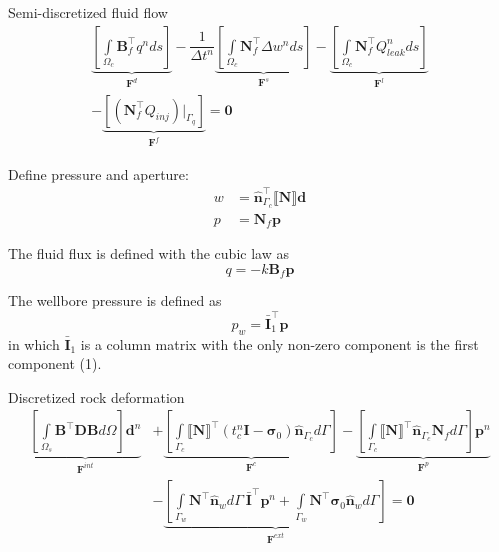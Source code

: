 \documentclass{article}
\begin{document}
Semi-discretized fluid flow
	\begin{equation}
\label{eqn:fluid-discrete}
\begin{gathered}
\underbrace{\left[\int\limits_{\Omega_c}
	\mathbf{B}_f^\top q^n ds 
	\right]}_{\mathbf{F}^d}
-
\dfrac{1}{\Delta t^n}
\underbrace{\left[
	\int\limits_{\Omega_c} \mathbf{N}_f^\top \Delta w^n ds 
	\right]}_{\mathbf{F}^s}
-
\underbrace{\left[
	\int\limits_{\Omega_c} \mathbf{N}_f^{\top} Q_{leak}^n ds
	\right]}_{\mathbf{F}^l}
	\\
-
\underbrace{\left[
	\left(\mathbf{N}_f^{\top} Q_{inj} \right) \Big\rvert_{\Gamma_q} 
	\right]}_{\mathbf{F}^f}
= \mathbf{0} 
\end{gathered}
\end{equation}


Define pressure and aperture: 
\begin{align}
	w &= \hat{\mathbf{n}}_{\Gamma_c}^{\top} \llbracket\mathbf{N}\rrbracket \mathbf{d}
	\\
	p &= \mathbf{N}_f \mathbf{p}
\end{align}

The fluid flux is defined with the cubic law as
\begin{equation}
q = -k \mathbf{B}_f \mathbf{p}
\end{equation}

The wellbore pressure is defined as
\begin{equation}
	p_w = \bar{\mathbf{I}}_1^{\top} \mathbf{p}
\end{equation}
in which $\bar{\mathbf{I}}_1$ is a column matrix with the only non-zero component is the first component (1).

Discretized rock deformation	
\begin{equation}
\begin{aligned}
\underbrace{\left[\int\limits_{\Omega_s} \mathbf{B}^{\top} \mathbf{D} \mathbf{B} d\Omega \right] \mathbf{d}^n}_{\mathbf{F}^{int}}
&+ 
\underbrace{
	\left[\int\limits_{\Gamma_{c}} \llbracket \mathbf{N} \rrbracket ^{\top} \left(t_c^n \mathbf{I} - \boldsymbol\sigma_0 \right)\hat{\mathbf{n}}_{\Gamma_c} d\Gamma \right]	
}_{\mathbf{F}^{c}}
- 
\underbrace{\left[\int\limits_{\Gamma_{c}} \llbracket \mathbf{N} \rrbracket ^{\top} \hat{\mathbf{n}}_{\Gamma_c} \mathbf{N}_f d\Gamma \right] \mathbf{p}^n
}_{\mathbf{F}^{p}}
\\
&- 
\underbrace{\left[\int\limits_{\Gamma_w} \mathbf{N}^{\top} \hat{\mathbf{n}}_{w} d\Gamma \:
\bar{\mathbf{I}}^{\top}\mathbf{p}^n
+ 
\int\limits_{\Gamma_w} \mathbf{N}^{\top} \boldsymbol\sigma_0\hat{\mathbf{n}}_{w} d\Gamma
 \right]}_{\mathbf{F}^{ext}}
= \mathbf{0}
\end{aligned}
\end{equation}
\end{document}
